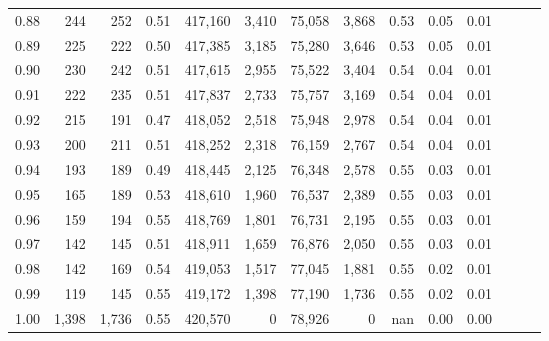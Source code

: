 \begin{tabular}{rrrrrrrrrrrrrr}
0.88 &     244 &    252 &  0.51 &  417,160 &    3,410 &  75,058 &   3,868 &  0.53 &  0.05 &      0.01 \\
0.89 &     225 &    222 &  0.50 &  417,385 &    3,185 &  75,280 &   3,646 &  0.53 &  0.05 &      0.01 \\
0.90 &     230 &    242 &  0.51 &  417,615 &    2,955 &  75,522 &   3,404 &  0.54 &  0.04 &      0.01 \\
0.91 &     222 &    235 &  0.51 &  417,837 &    2,733 &  75,757 &   3,169 &  0.54 &  0.04 &      0.01 \\
0.92 &     215 &    191 &  0.47 &  418,052 &    2,518 &  75,948 &   2,978 &  0.54 &  0.04 &      0.01 \\
0.93 &     200 &    211 &  0.51 &  418,252 &    2,318 &  76,159 &   2,767 &  0.54 &  0.04 &      0.01 \\
0.94 &     193 &    189 &  0.49 &  418,445 &    2,125 &  76,348 &   2,578 &  0.55 &  0.03 &      0.01 \\
0.95 &     165 &    189 &  0.53 &  418,610 &    1,960 &  76,537 &   2,389 &  0.55 &  0.03 &      0.01 \\
0.96 &     159 &    194 &  0.55 &  418,769 &    1,801 &  76,731 &   2,195 &  0.55 &  0.03 &      0.01 \\
0.97 &     142 &    145 &  0.51 &  418,911 &    1,659 &  76,876 &   2,050 &  0.55 &  0.03 &      0.01 \\
0.98 &     142 &    169 &  0.54 &  419,053 &    1,517 &  77,045 &   1,881 &  0.55 &  0.02 &      0.01 \\
0.99 &     119 &    145 &  0.55 &  419,172 &    1,398 &  77,190 &   1,736 &  0.55 &  0.02 &      0.01 \\
1.00 &   1,398 &  1,736 &  0.55 &  420,570 &        0 &  78,926 &       0 &   nan &  0.00 &      0.00 \\
\bottomrule
\end{tabular}
